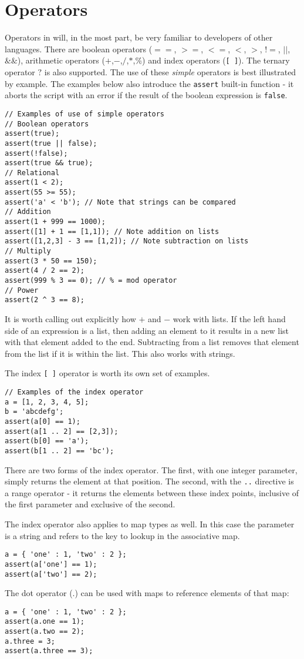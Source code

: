 \chapter{Operators}
Operators  in \Reflex will, in the most part, be very familiar to developers of other languages. There are boolean  operators ($==$, $>=$, $<=$, $<$, $>$, $!=$, $||$, $\&\&$), arithmetic  operators ($+$,$-$,$/$,$*$,$\%$) and index  operators (\Verb+[ ]+). The ternary  operator $?$ is also supported. The use of these \emph{simple} operators is best illustrated by example. The examples below also introduce the \verb+assert+ built-in function - it aborts the \Reflex script with an error if the result of the boolean expression is \verb+false+.
\begin{lstlisting}[caption={Simple operators}]
// Examples of use of simple operators
// Boolean operators
assert(true);
assert(true || false);
assert(!false);
assert(true && true);
// Relational
assert(1 < 2);
assert(55 >= 55);
assert('a' < 'b'); // Note that strings can be compared
// Addition
assert(1 + 999 == 1000);
assert([1] + 1 == [1,1]); // Note addition on lists
assert([1,2,3] - 3 == [1,2]); // Note subtraction on lists
// Multiply
assert(3 * 50 == 150);
assert(4 / 2 == 2);
assert(999 % 3 == 0); // % = mod operator
// Power
assert(2 ^ 3 == 8);
\end{lstlisting}
It is worth calling out explicitly how $+$ and $-$ work with lists. If the left hand side of an expression is a list, then adding an element to it results in a new list with that element added to the end. Subtracting from a list removes that element from the list if it is within the list. This also works with strings.

The index \Verb+[ ]+ operator is worth its own set of examples.
\begin{lstlisting}[caption={Index operator}]
// Examples of the index operator
a = [1, 2, 3, 4, 5];
b = 'abcdefg';
assert(a[0] == 1);
assert(a[1 .. 2] == [2,3]);
assert(b[0] == 'a');
assert(b[1 .. 2] == 'bc');
\end{lstlisting}
There are two forms of the index operator. The first, with one integer parameter, simply returns the element at that position. The second, with the \Verb+..+ directive is a range operator - it returns the elements between these index points, inclusive of the first parameter and exclusive of the second.

The index operator also applies to map types as well. In this case the parameter is a string and refers to the key to lookup in the associative map.
\begin{lstlisting}[caption={Index operator on maps}]
a = { 'one' : 1, 'two' : 2 };
assert(a['one'] == 1);
assert(a['two'] == 2);
\end{lstlisting}

The dot operator ($.$) can be used with maps to reference elements of that map:

\begin{lstlisting}[caption={Dot operator on maps}]
a = { 'one' : 1, 'two' : 2 };
assert(a.one == 1);
assert(a.two == 2);
a.three = 3;
assert(a.three == 3);
\end{lstlisting}
